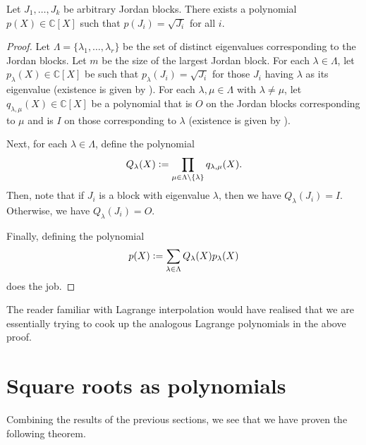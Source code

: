 \documentclass[12pt]{article}
\begin{document}
\begin{cor} \label{cor:jordan-common-polynomial}
	Let $J_{1}, \ldots, J_{k}$ be arbitrary Jordan blocks. There exists a polynomial $p(X) \in \mathbb{C}[X]$ such that $p(J_{i}) = \sqrt{J_{i}}$ for all $i$.
\end{cor}
\begin{proof} 
	Let $\Lambda = \{\lambda_{1}, \ldots, \lambda_{r}\}$ be the set of distinct eigenvalues corresponding to the Jordan blocks. Let $m$ be the size of the largest Jordan block. \newline
	For each $\lambda \in \Lambda$, let $p_{\lambda}(X) \in \mathbb{C}[X]$ be such that $p_{\lambda}(J_{i}) = \sqrt{J_{i}}$ for those $J_{i}$ having $\lambda$ as its eigenvalue (existence is given by ). \newline
	For each $\lambda, \mu \in \Lambda$ with $\lambda \neq \mu$, let $q_{\lambda, \mu}(X) \in \mathbb{C}[X]$ be a polynomial that is $O$ on the Jordan blocks corresponding to $\mu$ and is $I$ on those corresponding to $\lambda$ (existence is given by ).

	Next, for each $\lambda \in \Lambda$, define the polynomial
	\begin{equation*} 
		Q_{\lambda}(X) \vcentcolon= \prod_{\mu \in \Lambda \setminus \{\lambda\}} q_{\lambda, \mu}(X).
	\end{equation*}
	Then, note that if $J_{i}$ is a block with eigenvalue $\lambda$, then we have $Q_{\lambda}(J_{i}) = I$. Otherwise, we have $Q_{\lambda}(J_{i}) = O$.

	Finally, defining the polynomial
	\begin{equation*} 
		p(X) \vcentcolon= \sum_{\lambda \in \Lambda} Q_{\lambda}(X) p_{\lambda}(X)
	\end{equation*}
	does the job.
\end{proof}

\begin{rem}
	The reader familiar with Lagrange interpolation would have realised that we are essentially trying to cook up the analogous Lagrange polynomials in the above proof.
\end{rem}

\section{Square roots as polynomials}

Combining the results of the previous sections, we see that we have proven the following theorem.
\end{document}
